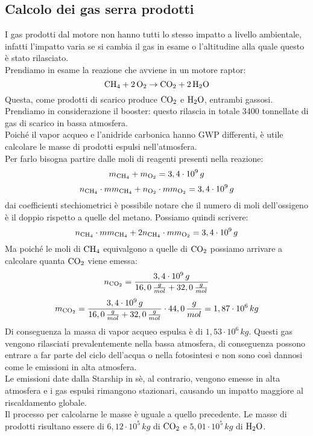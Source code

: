 \subsection{Calcolo dei gas serra prodotti}
I gas prodotti dal motore non hanno tutti lo stesso impatto a livello ambientale, infatti l'impatto varia se si cambia il gas in esame o l'altitudine alla quale questo è stato rilasciato.\\
Prendiamo in esame la reazione che avviene in un motore raptor:
$$
\ce{CH4} + \ce{2O2} \rightarrow \ce{CO2} + \ce{2H2O}
$$
Questa, come prodotti di scarico produce $\ce{CO2}$ e $\ce{H2O}$, entrambi gassosi.\\
Prendiamo in considerazione il booster: questo rilascia in totale 3400 tonnellate di gas di scarico in bassa atmosfera.\\
Poiché il vapor acqueo e l'anidride carbonica hanno GWP differenti, è utile calcolare le masse di prodotti espulsi nell'atmosfera.\\
Per farlo bisogna partire dalle moli di reagenti presenti nella reazione:
$$
m_{\ce{CH4}} + m_{\ce{O2}} = 3,4 \cdot 10^9\,g
$$
$$
n_{\ce{CH4}} \cdot mm_{\ce{CH4}} + n_{\ce{O2}} \cdot mm_{\ce{O2}} = 3,4 \cdot 10^9\,g
$$
dai coefficienti stechiometrici è possibile notare che il numero di moli dell'ossigeno è il doppio rispetto a quelle del metano. Possiamo quindi scrivere:
$$
n_{\ce{CH4}} \cdot mm_{\ce{CH4}} + 2n_{\ce{CH4}} \cdot mm_{\ce{O2}} = 3,4 \cdot 10^9\,g
$$
Ma poiché le moli di $\ce{CH4}$ equivalgono a quelle di $\ce{CO2}$ possiamo arrivare a calcolare quanta $\ce{CO2}$ viene emessa:
$$
n_{\ce{CO2}} = \frac{3,4 \cdot 10^9\,g}{16,0\,\frac{g}{mol} + 32,0\,\frac{g}{mol}}
$$
$$
m_{\ce{CO2}} = \frac{3,4 \cdot 10^9\,g}{16,0\,\frac{g}{mol} + 32,0\,\frac{g}{mol} } \cdot 44,0\,\frac{g}{mol} = 1,87 \cdot 10^6\,kg
$$
Di conseguenza la massa di vapor acqueo espulsa è di $1,53 \cdot 10^6\,kg$.
Questi gas vengono rilasciati prevalentemente nella bassa atmosfera, di conseguenza possono entrare a far parte del ciclo dell'acqua o nella fotosintesi e non sono così dannosi come le emissioni in alta atmosfera.\\
Le emissioni date dalla Starship in sè, al contrario, vengono emesse in alta atmosfera e i gas espulsi rimangono stazionari, causando un impatto maggiore al riscaldamento globale.\\
Il processo per calcolarne le masse è uguale a quello precedente. Le masse di prodotti risultano essere di $6,12 \cdot 10^5\,kg$ di $\ce{CO2}$ e $5,01 \cdot 10^5\,kg$ di $\ce{H2O}$.\\
